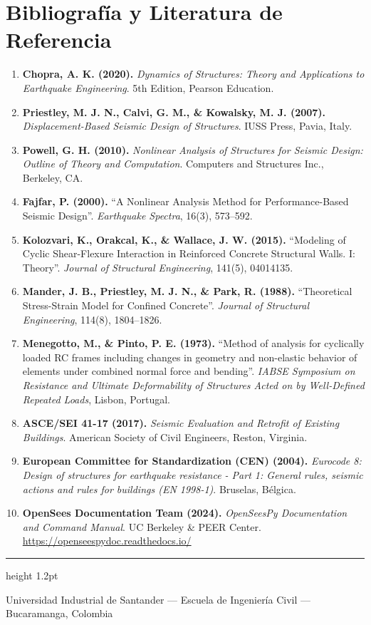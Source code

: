 \documentclass[11pt,letterpaper]{article}
\begin{document}
\section{Bibliografía y Literatura de Referencia}

\begin{enumerate}
    \item \textbf{Chopra, A. K. (2020).} \textit{Dynamics of Structures: Theory and Applications to Earthquake Engineering}. 5th Edition, Pearson Education.
    \item \textbf{Priestley, M. J. N., Calvi, G. M., \& Kowalsky, M. J. (2007).} \textit{Displacement-Based Seismic Design of Structures}. IUSS Press, Pavia, Italy.
    \item \textbf{Powell, G. H. (2010).} \textit{Nonlinear Analysis of Structures for Seismic Design: Outline of Theory and Computation}. Computers and Structures Inc., Berkeley, CA.
    \item \textbf{Fajfar, P. (2000).} ``A Nonlinear Analysis Method for Performance-Based Seismic Design''. \textit{Earthquake Spectra}, 16(3), 573--592.
    \item \textbf{Kolozvari, K., Orakcal, K., \& Wallace, J. W. (2015).} ``Modeling of Cyclic Shear-Flexure Interaction in Reinforced Concrete Structural Walls. I: Theory''. \textit{Journal of Structural Engineering}, 141(5), 04014135.
    \item \textbf{Mander, J. B., Priestley, M. J. N., \& Park, R. (1988).} ``Theoretical Stress-Strain Model for Confined Concrete''. \textit{Journal of Structural Engineering}, 114(8), 1804--1826.
    \item \textbf{Menegotto, M., \& Pinto, P. E. (1973).} ``Method of analysis for cyclically loaded RC frames including changes in geometry and non-elastic behavior of elements under combined normal force and bending''. \textit{IABSE Symposium on Resistance and Ultimate Deformability of Structures Acted on by Well-Defined Repeated Loads}, Lisbon, Portugal.
    \item \textbf{ASCE/SEI 41-17 (2017).} \textit{Seismic Evaluation and Retrofit of Existing Buildings}. American Society of Civil Engineers, Reston, Virginia.
    \item \textbf{European Committee for Standardization (CEN) (2004).} \textit{Eurocode 8: Design of structures for earthquake resistance - Part 1: General rules, seismic actions and rules for buildings (EN 1998-1)}. Bruselas, Bélgica.
    \item \textbf{OpenSees Documentation Team (2024).} \textit{OpenSeesPy Documentation and Command Manual}. UC Berkeley \& PEER Center. \url{https://openseespydoc.readthedocs.io/}
\end{enumerate}

\vspace{0.4cm}
\begin{center}
    {\color{uispurple}\hrule height 1.2pt}\vspace{0.2cm}
    {\footnotesize\color{uisgray} Universidad Industrial de Santander --- Escuela de Ingeniería Civil --- Bucaramanga, Colombia}
\end{center}
\end{document}
